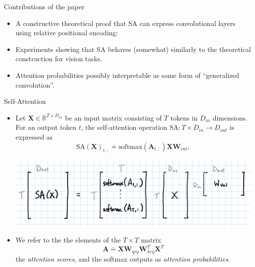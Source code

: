 \documentclass[9pt]{beamer}
\newcommand{\bb}{\mathbb}
\newcommand{\mb}{\bm}
\begin{document}
\begin{frame}{Contributions of the paper}
\begin{itemize}
\item A constructive theoretical proof that SA can express convolutional layers using relative positional encoding:
\end{itemize}

\begin{center}
\vspace{.15in}
\noindent{}
\vspace{.2in}
\end{center}

\begin{itemize}
\item Experiments showing that SA behaves (somewhat) similarly to the theoretical construction for vision tasks. 

\item Attention probabilities possibly interpretable as some form of ``generalized convolution''.
\end{itemize}
\end{frame}


\begin{frame}{Self-Attention}
\begin{itemize}
\item Let $\bm X\in\bb R^{T\times D_{in}}$ be an input matrix consisting of $T$ tokens in $D_{in}$ dimensions. For an output token $t$, the self-attention operation $\mathrm{SA}:T\times D_{in}\rightarrow D_{out}$ is expressed as
\begin{equation}
  \mathrm{SA}(\mb X)_{t,:} \doteq \mathrm{softmax}(\mb A_{t,:})\mb X\mb W_{val},
\end{equation}
\begin{center}
    \includegraphics[width=.7\textwidth]{images/softmax.png}
\end{center}
\vspace{.1in}

\item We refer to the the elements of the $T\times T$ matrix
\begin{equation}
\mb A \doteq \mb X \mb W_{qry}\mb W_{key}^T\mb X^T
\end{equation}
the {\em attention scores}, and the softmax outputs as {\em attention probabilities}.
\end{itemize}
\end{frame}
\end{document}
